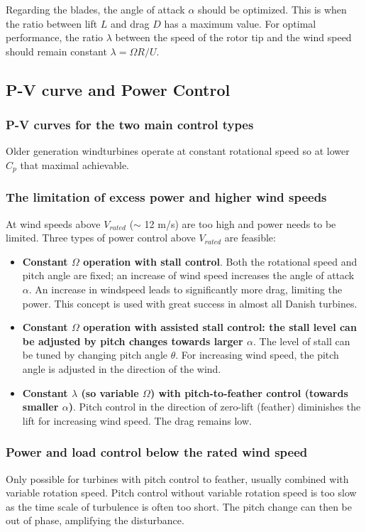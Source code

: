 \documentclass[a4paper,10pt]{article}
\begin{document}
Regarding the blades, the angle of attack $\alpha$ should be optimized. This is when the ratio between lift $L$ and drag $D$ has a maximum value. For optimal performance, the ratio $\lambda$ between the speed of the rotor tip and the wind speed should remain constant $\lambda = \Omega R/U$.


\subsection{P-V curve and Power Control}
\subsubsection{P-V curves for the two main control types}
Older generation windturbines operate at constant rotational speed so at lower $C_p$ that maximal achievable.

\subsubsection{The limitation of excess power and higher wind speeds}
At wind speeds above $V_{rated}$ ($\sim$ 12 m/s) are too high and power needs to be limited. Three types of power control above $V_{rated}$ are feasible:
\begin{itemize}
 \item \textbf{Constant $\Omega$ operation with stall control}. Both the rotational speed and pitch angle are fixed; an increase of wind speed increases the angle of attack $\alpha$. An increase in windspeed leads to significantly more drag, limiting the power. This concept is used with great success in almost all Danish turbines.
 \item \textbf{Constant $\Omega$ operation with assisted stall control: the stall level can be adjusted by pitch changes towards larger $\alpha$}. The level of stall can be tuned by changing pitch angle $\theta$. For increasing wind speed, the pitch angle is adjusted in the direction of the wind.
 \item \textbf{Constant $\lambda$ (so variable $\Omega$) with pitch-to-feather control (towards smaller $\alpha$)}. Pitch control in the direction of zero-lift (feather) diminishes the lift for increasing wind speed. The drag remains low.
\end{itemize}

\subsubsection{Power and load control below the rated wind speed}
Only possible for turbines with pitch control to feather, usually combined with variable rotation speed. Pitch control without variable rotation speed is too slow as the time scale of turbulence is often too short. The pitch change can then be out of phase, amplifying the disturbance.
\end{document}
